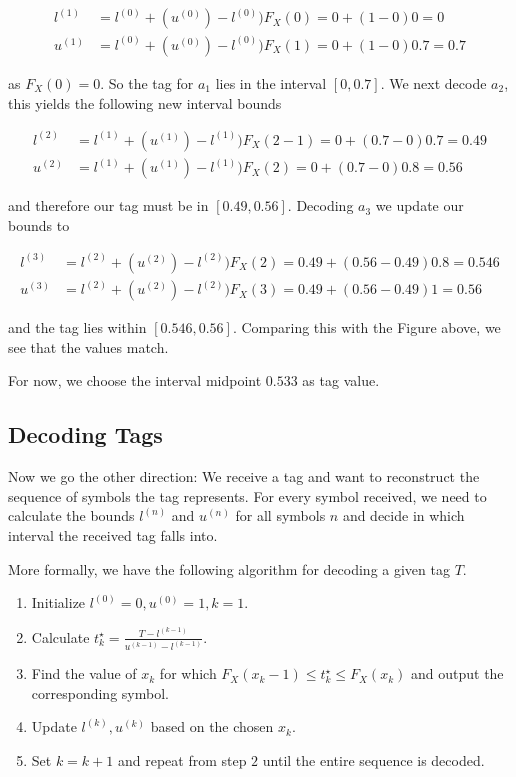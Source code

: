 \begin{align*}
    l^{(1)} &= l^{(0)} + (u^{(0)}) - l^{(0)}) F_X(0) = 0 + (1 - 0) 0 = 0 \\
    u^{(1)} &= l^{(0)} + (u^{(0)}) - l^{(0)}) F_X(1) = 0 + (1 - 0) 0.7 = 0.7
\end{align*}

as $F_X(0) = 0$. So the tag for $a_1$ lies in the interval $[0, 0.7]$. We next decode $a_2$, this yields the following new interval bounds

\begin{align*}
    l^{(2)} &= l^{(1)} + (u^{(1)}) - l^{(1)}) F_X(2-1) = 0 + (0.7 - 0) 0.7 = 0.49 \\
    u^{(2)} &= l^{(1)} + (u^{(1)}) - l^{(1)}) F_X(2) = 0 + (0.7 - 0) 0.8 = 0.56
\end{align*}

and therefore our tag must be in $[0.49, 0.56]$. Decoding $a_3$ we update our bounds to

\begin{align*}
    l^{(3)} &= l^{(2)} + (u^{(2)}) - l^{(2)}) F_X(2) = 0.49 + (0.56 - 0.49) 0.8 = 0.546 \\
    u^{(3)} &= l^{(2)} + (u^{(2)}) - l^{(2)}) F_X(3) = 0.49 + (0.56 - 0.49) 1 = 0.56
\end{align*}

and the tag lies within $[0.546, 0.56]$. Comparing this with the Figure above, we see that the values match.

For now, we choose the interval midpoint $0.533$ as tag value.

\subsection{Decoding Tags}

Now we go the other direction: We receive a tag and want to reconstruct the sequence of symbols the tag represents. For every symbol received, we need to calculate the bounds $l^{(n)}$ and $u^{(n)}$ for all symbols $n$ and decide in which interval the received tag falls into.

More formally, we have the following algorithm for decoding a given tag $T$.

\begin{enumerate}
    \item Initialize $l^{(0)} = 0, u^{(0)} = 1, k=1$.
    \item Calculate $t_k^\star = \frac{T - l^{(k-1)}}{u^{(k-1)} - l^{(k-1)}}$.
    \item Find the value of $x_k$ for which $F_X(x_k-1) \leq t_k^\star \leq F_X(x_k)$ and output the corresponding symbol.
    \item Update $l^{(k)}, u^{(k)}$ based on the chosen $x_k$.
    \item Set $k = k+1$ and repeat from step $2$ until the entire sequence is decoded.
\end{enumerate}


